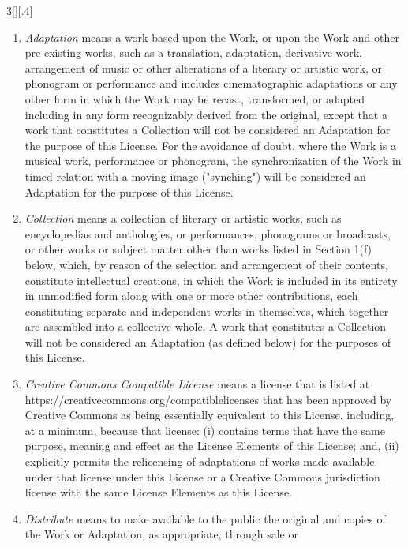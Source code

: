 \documentclass[8pt,a4paper]{article}
\begin{document}
\begin{multicols}{3}[][.4\paperwidth]
\begin{enumerate}
\begin{enumerate}
  \item \emph{Adaptation} means a work based upon the Work, or upon the Work
        and other pre-existing works, such as a translation, adaptation,
        derivative work, arrangement of music or other alterations of a
        literary or artistic work, or phonogram or performance and includes
        cinematographic adaptations or any other form in which the Work may be
        recast, transformed, or adapted including in any form recognizably
        derived from the original, except that a work that constitutes a
        Collection will not be considered an Adaptation for the purpose of
        this License. For the avoidance of doubt, where the Work is a musical
        work, performance or phonogram, the synchronization of the Work in
        timed-relation with a moving image ("synching") will be considered an
        Adaptation for the purpose of this License.
  \item \emph{Collection} means a collection of literary or artistic works,
        such as encyclopedias and anthologies, or performances, phonograms or
        broadcasts, or other works or subject matter other than works listed
        in Section 1(f) below, which, by reason of the selection and
        arrangement of their contents, constitute intellectual creations, in
        which the Work is included in its entirety in unmodified form along
        with one or more other contributions, each constituting separate and
        independent works in themselves, which together are assembled into a
        collective whole. A work that constitutes a Collection will not be
        considered an Adaptation (as defined below) for the purposes of this
        License.
  \item \emph{Creative Commons Compatible License} means a license that is
        listed at https://creativecommons.org/compatiblelicenses that has been
        approved by Creative Commons as being essentially equivalent to this
        License, including, at a minimum, because that license: (i) contains
        terms that have the same purpose, meaning and effect as the License
        Elements of this License; and, (ii) explicitly permits the relicensing
        of adaptations of works made available under that license under this
        License or a Creative Commons jurisdiction license with the same
        License Elements as this License.
  \item \emph{Distribute} means to make available to the public the original
        and copies of the Work or Adaptation, as appropriate, through sale or

\end{enumerate}
\end{enumerate}
\end{multicols}
\end{document}
